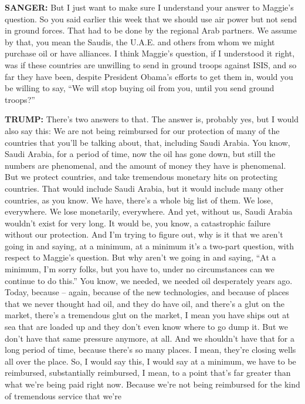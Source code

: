 \textbf{SANGER:} But I just want to make sure I understand your answer
to Maggie's question. So you said earlier this week that we should use
air power but not send in ground forces. That had to be done by the
regional Arab partners. We assume by that, you mean the Saudis, the
U.A.E. and others from whom we might purchase oil or have alliances. I
think Maggie's question, if I understood it right, was if these
countries are unwilling to send in ground troops against ISIS, and so
far they have been, despite President Obama's efforts to get them in,
would you be willing to say, ``We will stop buying oil from you, until
you send ground troops?''

\textbf{TRUMP:} There's two answers to that. The answer is, probably
yes, but I would also say this: We are not being reimbursed for our
protection of many of the countries that you'll be talking about, that,
including Saudi Arabia. You know, Saudi Arabia, for a period of time,
now the oil has gone down, but still the numbers are phenomenal, and the
amount of money they have is phenomenal. But we protect countries, and
take tremendous monetary hits on protecting countries. That would
include Saudi Arabia, but it would include many other countries, as you
know. We have, there's a whole big list of them. We lose, everywhere. We
lose monetarily, everywhere. And yet, without us, Saudi Arabia wouldn't
exist for very long. It would be, you know, a catastrophic failure
without our protection. And I'm trying to figure out, why is it that we
aren't going in and saying, at a minimum, at a minimum it's a two-part
question, with respect to Maggie's question. But why aren't we going in
and saying, ``At a minimum, I'm sorry folks, but you have to, under no
circumstances can we continue to do this.'' You know, we needed, we
needed oil desperately years ago. Today, because -- again, because of
the new technologies, and because of places that we never thought had
oil, and they do have oil, and there's a glut on the market, there's a
tremendous glut on the market, I mean you have ships out at sea that are
loaded up and they don't even know where to go dump it. But we don't
have that same pressure anymore, at all. And we shouldn't have that for
a long period of time, because there's so many places. I mean, they're
closing wells all over the place. So, I would say this, I would say at a
minimum, we have to be reimbursed, substantially reimbursed, I mean, to
a point that's far greater than what we're being paid right now. Because
we're not being reimbursed for the kind of tremendous service that we're
